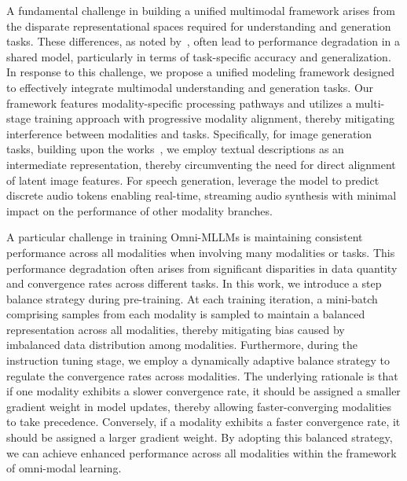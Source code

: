 A fundamental challenge in building a unified multimodal framework arises from the disparate representational spaces required for understanding and generation tasks. These differences, as noted by~\cite{deepseek_janus}, often lead to performance degradation in a shared model, particularly in terms of task-specific accuracy and generalization. In response to this challenge, we propose a unified modeling framework designed to effectively integrate multimodal understanding and generation tasks. Our framework features modality-specific processing pathways and utilizes a multi-stage training approach with progressive modality alignment, thereby mitigating interference between modalities and tasks. Specifically, for image generation tasks, building upon the works~\cite{li2023textbind, unifiedmllm, wang2024modaverse}, we employ textual descriptions as an intermediate representation, thereby circumventing the need for direct alignment of latent image features. For speech generation, leverage the model to predict discrete audio tokens enabling real-time, streaming audio synthesis with minimal impact on the performance of other modality branches.

A particular challenge in training Omni-MLLMs is maintaining consistent performance across all modalities when involving many modalities or tasks. This performance degradation often arises from significant disparities in data quantity and convergence rates across different tasks. In this work, we introduce a step balance strategy during pre-training. At each training iteration, a mini-batch comprising samples from each modality is sampled to maintain a balanced representation across all modalities, thereby mitigating bias caused by imbalanced data distribution among modalities. Furthermore, during the instruction tuning stage, we employ a dynamically adaptive balance strategy to regulate the convergence rates across modalities. The underlying rationale is that if one modality exhibits a slower convergence rate, it should be assigned a smaller gradient weight in model updates, thereby allowing faster-converging modalities to take precedence. Conversely, if a modality exhibits a faster convergence rate, it should be assigned a larger gradient weight. By adopting this balanced strategy, we can achieve enhanced performance across all modalities within the framework of omni-modal learning.

